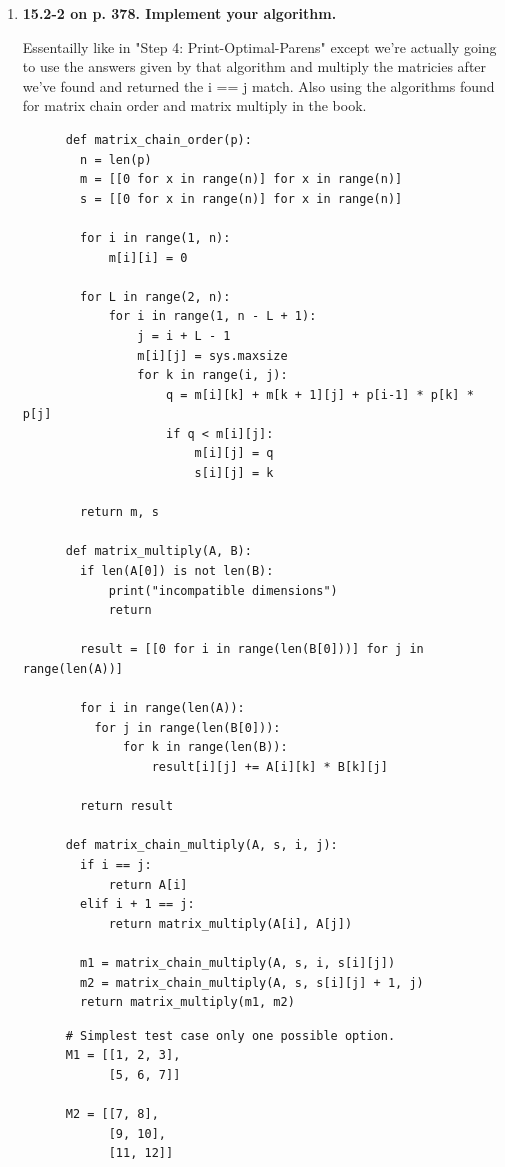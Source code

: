 \documentclass{article}
\begin{document}
\begin{enumerate}
    \item \textbf{15.2-2 on p. 378. Implement your algorithm.}
    
    Essentailly like in "Step 4: Print-Optimal-Parens" except we're actually going to use the answers given by that algorithm and multiply the matricies after we've found and returned the i == j match.
    Also using the algorithms found for matrix chain order and matrix multiply in the book.

    \begin{lstlisting}
      def matrix_chain_order(p):
        n = len(p)
        m = [[0 for x in range(n)] for x in range(n)]
        s = [[0 for x in range(n)] for x in range(n)]
    
        for i in range(1, n): 
            m[i][i] = 0
    
        for L in range(2, n): 
            for i in range(1, n - L + 1): 
                j = i + L - 1
                m[i][j] = sys.maxsize 
                for k in range(i, j): 
                    q = m[i][k] + m[k + 1][j] + p[i-1] * p[k] * p[j] 
                    if q < m[i][j]: 
                        m[i][j] = q
                        s[i][j] = k
    
        return m, s
  
      def matrix_multiply(A, B):
        if len(A[0]) is not len(B):
            print("incompatible dimensions")
            return
        
        result = [[0 for i in range(len(B[0]))] for j in range(len(A))]
        
        for i in range(len(A)):
          for j in range(len(B[0])):
              for k in range(len(B)):
                  result[i][j] += A[i][k] * B[k][j]
                
        return result
      
      def matrix_chain_multiply(A, s, i, j):
        if i == j:
            return A[i]
        elif i + 1 == j:
            return matrix_multiply(A[i], A[j])
        
        m1 = matrix_chain_multiply(A, s, i, s[i][j])
        m2 = matrix_chain_multiply(A, s, s[i][j] + 1, j)
        return matrix_multiply(m1, m2)      
    \end{lstlisting}

    \begin{lstlisting}
      # Simplest test case only one possible option.
      M1 = [[1, 2, 3],
            [5, 6, 7]]
      
      M2 = [[7, 8],
            [9, 10],
            [11, 12]]
      

\end{lstlisting}
\end{enumerate}
\end{document}
